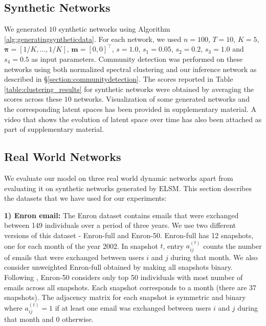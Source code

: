\documentclass[letterpaper]{article}
\begin{document}
\subsection{Synthetic Networks}
\label{section:generatingsyntheticnetworks}
We generated $10$ synthetic networks using Algorithm \ref{alg:generatingsyntheticdata}. For each network, we used $n=100$, $T=10$, $K=5$, $\mathbf{\pi}=[1/K, ..., 1/K]$, $\mathbf{m}=[0, 0]^\intercal$, $s=1.0$, $s_1=0.05$, $s_2=0.2$, $s_3=1.0$ and $s_4=0.5$ as input parameters. Community detection was performed on these networks using both normalized spectral clustering \cite{Luxburg:2007:ATutorialOnSpectralClustering} and our inference network as described in \S \ref{section:communitydetection}. The scores reported in Table \ref{table:clustering_results} for synthetic networks were obtained by averaging the scores across these $10$ networks. Visualization of some generated networks and the corresponding latent spaces has been provided in supplementary material. A video that shows the evolution of latent space over time has also been attached as part of supplementary material.


\subsection{Real World Networks}
\label{section:realworldnetworks}
We evaluate our model on three real world dynamic networks apart from evaluating it on synthetic networks generated by ELSM. This section describes the datasets that we have used for our experiments:

\textbf{1) Enron email:}
The Enron dataset \cite{KlimtEtAl:2004:TheEnronCorpus} contains emails that were exchanged between 149 individuals over a period of three years. We use two different versions of this dataset - Enron-full and Enron-50. Enron-full has 12 snapshots, one for each month of the year 2002. In snapshot ${t}$, entry ${a_{ij}^{(t)}}$ counts the number of emails that were exchanged between users ${i}$ and ${j}$ during that month. We also consider unweighted Enron-full obtained by making all snapshots binary. Following \cite{FouldsEtAl:2011:ADynamicRelationalInfiniteFeatureModelForLongitudinalSocialNetworks}, Enron-50 considers only top 50 individuals with most number of emails across all snapshots. Each snapshot corresponds to a month (there are 37 snapshots). The adjacency matrix for each snapshot is symmetric and binary where ${a_{ij}^{(t)}} = 1$ if at least one email was exchanged between users ${i}$ and ${j}$ during that month and $0$ otherwise.
\end{document}
